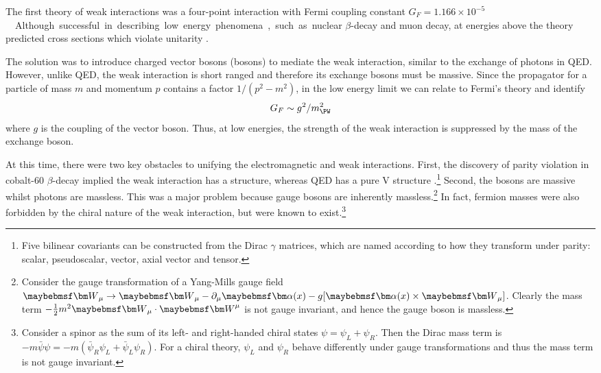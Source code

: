 
The first theory of weak interactions was a four-point interaction with Fermi coupling 
constant \unit{$G_F = 1.166\times 10^{-5}$}{\GeV\rpsquared}. Although successful in 
describing low energy phenomena, such as nuclear $\beta$-decay and muon decay, at 
energies above \unit{}{\GeV} the theory predicted cross sections which violate 
unitarity \cite{Aitchison}.

The solution was to introduce charged vector bosons (\PWpm bosons) to mediate the weak 
interaction, similar to the exchange of photons in \ac{QED}. However, unlike \ac{QED}, 
the weak interaction is short ranged and therefore its exchange bosons must be massive. 
Since the propagator for a particle of mass $m$ and momentum $p$ contains a factor 
$1 / (p^2 - m^2)$, in the low energy limit we can relate to Fermi's theory and identify
\begin{equation}
	G_F \sim g^2 / m_{\PW}^2
\end{equation}
where $g$ is the coupling of the vector boson. Thus, at low energies, the strength of the 
weak interaction is suppressed by the mass of the exchange boson.

At this time, there were two key obstacles to unifying the electromagnetic and weak 
interactions. First, the discovery of parity violation in cobalt-60 $\beta$-decay 
implied the weak interaction has a \VminusA structure, whereas \ac{QED} has a pure V 
structure \cite{Wu:1957}.\footnote{
	Five bilinear covariants can be constructed from the Dirac $\gamma$ matrices, which 
	are named according to how they transform under parity: scalar, pseudoscalar, vector, 
	axial vector and tensor.
}
Second, the \PWpm bosons are massive whilst photons are massless. This was a major 
problem because gauge bosons are inherently massless.\footnote{
	Consider the gauge transformation of a Yang-Mills gauge field 
	$\bvec{W}_{\mu} \rightarrow \bvec{W}_{\mu} - \partial_{\mu} \bvec{\alpha}(x)
	- g \lbrack \bvec{\alpha}(x) \times \bvec{W}_{\mu} \rbrack$. Clearly the mass term 
	$-\tfrac{1}{2}m^2 \bvec{W}_{\mu} \cdot \bvec{W}^{\mu}$ is not gauge invariant, and 
	hence the gauge boson is massless.}
In fact, fermion masses were also forbidden by the chiral nature of the weak interaction, 
but were known to exist.\footnote{
	Consider a spinor as the sum of its left- and right-handed chiral states 
	$\psi = \psi_L + \psi_R$. Then the Dirac mass term is $-m \bar{\psi} \psi = 
	-m (\bar{\psi}_R \psi_L + \bar{\psi}_L \psi_R)$. For a chiral theory, $\psi_L$ and
	$\psi_R$ behave differently under gauge transformations and thus the mass term is not 
	gauge invariant.
}

